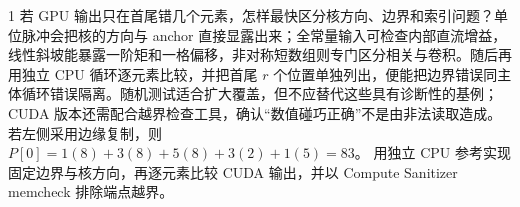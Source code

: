 \begin{solutionexercise}{1}
若 GPU 输出只在首尾错几个元素，怎样最快区分核方向、边界和索引问题？单位脉冲会把核的方向与 anchor 直接显露出来；全常量输入可检查内部直流增益，线性斜坡能暴露一阶矩和一格偏移，非对称短数组则专门区分相关与卷积。随后再用独立 CPU 循环逐元素比较，并把首尾 $r$ 个位置单独列出，便能把边界错误同主体循环错误隔离。随机测试适合扩大覆盖，但不应替代这些具有诊断性的基例；CUDA 版本还需配合越界检查工具，确认“数值碰巧正确”不是由非法读取造成。
\variantheading 若左侧采用边缘复制，则 $P[0]=1(8)+3(8)+5(8)+3(2)+1(5)=83$。
\practiceheading 用独立 CPU 参考实现固定边界与核方向，再逐元素比较 CUDA 输出，并以 Compute Sanitizer memcheck 排除端点越界。
\end{solutionexercise}

